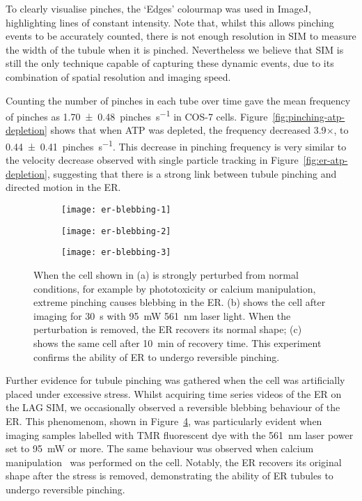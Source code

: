 To clearly visualise pinches, the `Edges' colourmap was used in ImageJ, highlighting lines of constant intensity. 
Note that, whilst this allows pinching events to be accurately counted, there is not enough resolution in SIM to measure the width of the tubule when it is pinched. 
Nevertheless we believe that SIM is still the only technique capable of capturing these dynamic events, due to its combination of spatial resolution and imaging speed. 

Counting the number of pinches in each tube over time gave the mean frequency of pinches as \SI[separate-uncertainty=true]{1.70 \pm 0.48}{pinches\per\second} in COS-7 cells. 
Figure~\ref{fig:pinching-atp-depletion} shows that when ATP was depleted, the frequency decreased 3.9$\times$, to \SI[separate-uncertainty=true]{0.44 \pm 0.41}{pinches\per\second}. 
This decrease in pinching frequency is very similar to the velocity decrease observed with single particle tracking in Figure~\ref{fig:er-atp-depletion}, suggesting that there is a strong link between tubule pinching and directed motion in the ER. 

\begin{figure}[htbp!]
\centering
\begin{subfigure}[b]{0.325\textwidth}
	\texttt{[image: er-blebbing-1]}
	\caption{}\label{fig:er-blebbing-1}
\end{subfigure}\hfill
\begin{subfigure}[b]{0.325\textwidth}
	\texttt{[image: er-blebbing-2]}
	\caption{}\label{fig:er-blebbing-2}
\end{subfigure}\hfill
\begin{subfigure}[b]{0.325\textwidth}
	\texttt{[image: er-blebbing-3]}
	\caption{}\label{fig:er-blebbing-3}
\end{subfigure}
\caption[ER: Phototoxicity confirms the ability of ER to undergo reversible pinching]{When the cell shown in (a) is strongly perturbed from normal conditions, for example by phototoxicity or calcium manipulation, extreme pinching causes blebbing in the ER. (b) shows the cell after imaging for \SI{30}{\second} with \SI{95}{\milli\watt} \SI{561}{\nano\metre} laser light. When the perturbation is removed, the ER recovers its normal shape; (c) shows the same cell after \SI{10}{\minute} of recovery time. This experiment confirms the ability of ER to undergo reversible pinching. } 
\label{fig:ER-blebbing}
\end{figure}

Further evidence for tubule pinching was gathered when the cell was artificially placed under excessive stress. 
Whilst acquiring time series videos of the ER on the LAG SIM, we occasionally observed a reversible blebbing behaviour of the ER. 
This phenomenom, shown in Figure~\ref{fig:ER-blebbing}, was particularly evident when imaging samples labelled with TMR fluorescent dye with the \SI{561}{\nano\meter} laser power set to \SI{95}{\milli\watt} or more. %
The same behaviour was observed when calcium manipulation~\cite{subramanian1997calcium} was performed on the cell. 
Notably, the ER recovers its original shape after the stress is removed, demonstrating the ability of ER tubules to undergo reversible pinching.

